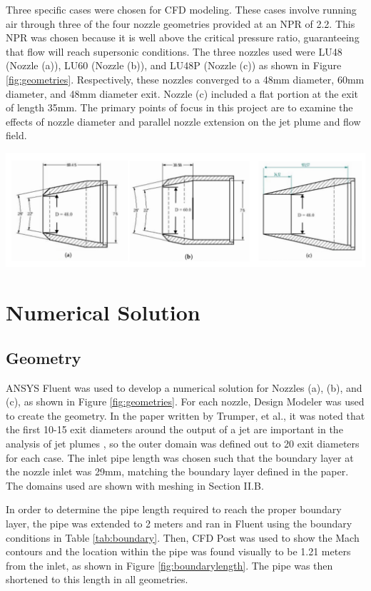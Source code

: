 \documentclass[12pt]{article} %
\begin{document}
Three specific cases were chosen for CFD modeling. These cases involve running air through three of the four nozzle geometries provided at an NPR of 2.2. This NPR was chosen because it is well above the critical pressure ratio, guaranteeing that flow will reach supersonic conditions. The three nozzles used were LU48 (Nozzle (a)), LU60 (Nozzle (b)), and LU48P (Nozzle (c)) as shown in Figure \ref{fig:geometries}. Respectively, these nozzles converged to a 48mm diameter, 60mm diameter, and 48mm diameter exit. Nozzle (c) included a flat portion at the exit of length 35mm. The primary points of focus in this project are to examine the effects of nozzle diameter and parallel nozzle extension on the jet plume and flow field. 

\begin{center}
    \includegraphics[width = \linewidth]{Geometries.png}
    \label{fig:geometries}
\end{center}

\section{Numerical Solution}
\subsection{Geometry}
ANSYS Fluent was used to develop a numerical solution for Nozzles (a), (b), and (c), as shown in Figure \ref{fig:geometries}. For each nozzle, Design Modeler was used to create the geometry. In the paper written by Trumper, et al., it was noted that the first 10-15 exit diameters around the output of a jet are important in the analysis of jet plumes \cite{MilesT.Trumper2018IoNE}, so the outer domain was defined out to 20 exit diameters for each case. The inlet pipe length was chosen such that the boundary layer at the nozzle inlet was 29mm, matching the boundary layer defined in the paper. The domains used are shown with meshing in Section II.B.\par

In order to determine the pipe length required to reach the proper boundary layer, the pipe was extended to 2 meters and ran in Fluent using the boundary conditions in Table \ref{tab:boundary}. Then, CFD Post was used to show the Mach contours and the location within the pipe was found visually to be 1.21 meters from the inlet, as shown in Figure \ref{fig:boundarylength}. The pipe was then shortened to this length in all geometries.
\end{document}
